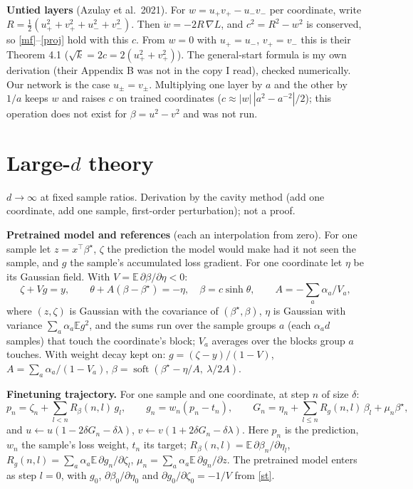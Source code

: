 \documentclass[10pt]{article}
\newcommand{\bs}{\beta^\star}\newcommand{\E}{\mathbb E}
\begin{document}
\textbf{Untied layers} (Azulay et al.\ 2021). For $w=u_+v_+-u_-v_-$ per coordinate, write $R=\frac12(u_+^2+v_+^2+u_-^2+v_-^2)$. Then $\dot w=-2R\,\nabla L$, and $c^2=R^2-w^2$ is conserved, so \eqref{mf}--\eqref{proj} hold with this $c$. From $w=0$ with $u_+=u_-$, $v_+=v_-$ this is their Theorem 4.1 ($\sqrt k=2c=2(u_+^2+v_+^2)$). The general-start formula is my own derivation (their Appendix B was not in the copy I read), checked numerically. Our network is the case $u_\pm=v_\pm$. Multiplying one layer by $a$ and the other by $1/a$ keeps $w$ and raises $c$ on trained coordinates ($c\approx|w|\,|a^2-a^{-2}|/2$); this operation does not exist for $\beta=u^2-v^2$ and was not run.

\section{Large-$d$ theory}
$d\to\infty$ at fixed sample ratios. Derivation by the cavity method (add one coordinate, add one sample, first-order perturbation); not a proof.

\textbf{Pretrained model and references} (each an interpolation from zero). For one sample let $z=x^\top\bs$, $\zeta$ the prediction the model would make had it not seen the sample, and $g$ the sample's accumulated loss gradient. For one coordinate let $\eta$ be its Gaussian field. With $V=\E\,\partial\beta/\partial\eta<0$:
\begin{equation}\label{st}
\zeta+Vg=y,\qquad \theta+A(\beta-\bs)=-\eta,\quad\beta=c\sinh\theta,\qquad A=-\sum_a\alpha_a/V_a ,
\end{equation}
where $(z,\zeta)$ is Gaussian with the covariance of $(\bs,\beta)$, $\eta$ is Gaussian with variance $\sum_a\alpha_a\E g^2$, and the sums run over the sample groups $a$ (each $\alpha_ad$ samples) that touch the coordinate's block; $V_a$ averages over the blocks group $a$ touches. With weight decay kept on: $g=(\zeta-y)/(1-V)$, $A=\sum_a\alpha_a/(1-V_a)$, $\beta=\operatorname{soft}(\bs-\eta/A,\ \lambda/2A)$.

\textbf{Finetuning trajectory.} For one sample and one coordinate, at step $n$ of size $\delta$:
\begin{equation}\label{dyn}
p_n=\zeta_n+\sum_{l<n}R_\beta(n,l)\,g_l,\qquad g_n=w_n(p_n-t_n),\qquad
G_n=\eta_n+\sum_{l\le n}R_g(n,l)\,\beta_l+\mu_n\bs ,
\end{equation}
and $u\leftarrow u(1-2\delta G_n-\delta\lambda)$, $v\leftarrow v(1+2\delta G_n-\delta\lambda)$. Here $p_n$ is the prediction, $w_n$ the sample's loss weight, $t_n$ its target; $R_\beta(n,l)=\E\,\partial\beta_n/\partial\eta_l$, $R_g(n,l)=\sum_a\alpha_a\E\,\partial g_n/\partial\zeta_l$, $\mu_n=\sum_a\alpha_a\E\,\partial g_n/\partial z$. The pretrained model enters as step $l=0$, with $g_0$, $\partial\beta_0/\partial\eta_0$ and $\partial g_0/\partial\zeta_0=-1/V$ from \eqref{st}.
\end{document}
